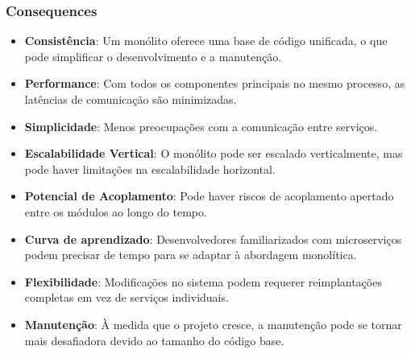 \subsubsection*{Consequences}
\begin{itemize}
	\item \textbf{Consistência}: Um monólito oferece uma base de código unificada, o que pode simplificar o desenvolvimento e a manutenção.
	\item \textbf{Performance}: Com todos os componentes principais no mesmo processo, as latências de comunicação são minimizadas.
	\item \textbf{Simplicidade}: Menos preocupações com a comunicação entre serviços.
	\item \textbf{Escalabilidade Vertical}: O monólito pode ser escalado verticalmente, mas pode haver limitações na escalabilidade horizontal.
	\item \textbf{Potencial de Acoplamento}: Pode haver riscos de acoplamento apertado entre os módulos ao longo do tempo.
	\item \textbf{Curva de aprendizado}: Desenvolvedores familiarizados com microserviços podem precisar de tempo para se adaptar à abordagem monolítica.
	\item \textbf{Flexibilidade}: Modificações no sistema podem requerer reimplantações completas em vez de serviços individuais.
	\item \textbf{Manutenção}: À medida que o projeto cresce, a manutenção pode se tornar mais desafiadora devido ao tamanho do código base.
\end{itemize}

